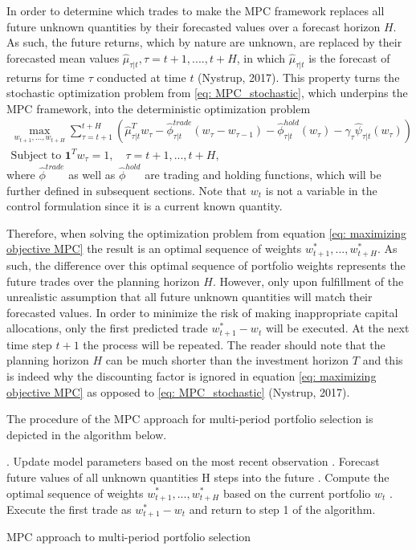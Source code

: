 In order to determine which trades to make the MPC framework replaces all future unknown quantities by their forecasted values over a forecast horizon $H$. As such, the future returns, which by nature are unknown, are replaced by their forecasted mean values $\hat{\mu}_{\tau|t},\tau = t+1,....,t+H$, in which $\hat{\mu}_{\tau|t}$ is the forecast of returns for time $\tau$ conducted at time $t$ 
(Nystrup, 2017). This property turns the stochastic optimization problem from \cref{eq: MPC_stochastic}, which underpins the MPC framework, into the deterministic optimization problem 
\begin{equation}
\begin{split}
    \max_{w_{t+1},\ldots,w_{t+H}} \sum_{\tau=t+1}^{t+H}(\hat{\mu}_{\tau|t}^Tw_\tau-\hat{\phi}_{\tau|t}^{trade}(w_\tau-w_{\tau-1})-\hat{\phi}_{\tau|t}^{hold}(w_\tau)-\gamma_\tau\hat{\psi}_{\tau|t}(w_\tau))
    \label{eq: maximizing objective MPC}
    \\
    \text{Subject to } \mathbf{1}^Tw_\tau=1, \quad \tau = t+1,...,t+H,
\end{split}    
\end{equation}
where $\hat{\phi}^{trade}$ as well as $\hat{\phi}^{hold}$ are trading and holding functions, which will be further defined in subsequent sections. Note that $w_t$ is not a variable in the control formulation since it is a current known quantity. 

Therefore, when solving the optimization problem from equation \ref{eq: maximizing objective MPC} the result is an optimal sequence of weights $w_{t+1}^*,..., w_{t+H}^*$. As such, the difference over this optimal sequence of portfolio weights represents the future trades over the planning horizon $H$. However, only upon fulfillment of the unrealistic assumption that all future unknown quantities will match their forecasted values. In order to minimize the risk of making inappropriate capital allocations, only the first predicted trade $w_{t+1}^*-w_t$ will be executed. At the next time step $t+1$ the process will be repeated. The reader should note that the planning horizon $H$ can be much shorter than the investment horizon $T$ and this is indeed why the discounting factor is ignored in equation \ref{eq: maximizing objective MPC} as opposed to \ref{eq: MPC_stochastic} 
(Nystrup, 2017).

The procedure of the MPC approach for multi-period portfolio selection is depicted in the algorithm below. 

\begin{algorithm}[H]
. Update model parameters based on the most recent observation
\Indm
{}. Forecast future values of all unknown quantities H steps into the future
. Compute the optimal sequence of weights $w_{t+1}^*,...,w_{t+H}^*$ based on the current portfolio $w_t$
. Execute the first trade as $w_{t+1}^* - w_t$ and return to step 1 of the algorithm.\;
\BlankLine
\caption{MPC approach to multi-period portfolio selection}
\label{algo:MPC}
\end{algorithm}

